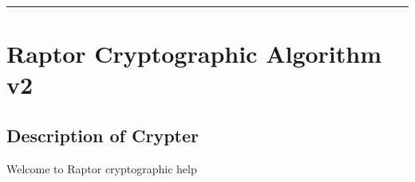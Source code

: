 \documentclass[letterpaper,10pt,english]{sphinxmanual}
\begin{document}
\bigskip\hrule\bigskip



\subsection{}
\label{\detokenize{decrypt_procedurev1:source-code}}
\begin{sphinxVerbatim}[commandchars=\\\{\}]
  
\PYG{p}{[}\PYG{p}{]}
  \PYG{p}{[}\PYG{p}{]}
  \PYG{p}{[}\PYG{p}{]}
  \PYG{p}{[}\PYG{p}{]}
        \PYG{p}{[}\PYG{p}{]}
        \PYG{p}{[}\PYG{p}{]}
  
 
\end{sphinxVerbatim}


\chapter{Raptor Cryptographic Algorithm v2}
\label{\detokenize{basetestrecursivev3:raptor-cryptographic-algorithm-v2}}\label{\detokenize{basetestrecursivev3::doc}}
\newpage
\section{Description of Crypter}
\label{\detokenize{Description of Crypterv2:description-of-crypter}}\label{\detokenize{Description of Crypterv2::doc}}
\sphinxAtStartPar
Welcome to Raptor cryptographic help
\end{document}
